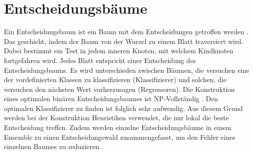 \chapter{Entscheidungsbäume}
\label{chapter:decision_trees}
Ein Entscheidungsbaum ist ein Baum mit dem Entscheidungen getroffen werden \cite{quinlan1990decision}. Das geschieht, indem der Baum von der Wurzel zu einem Blatt traversiert wird. Dabei bestimmt ein
Test in jedem inneren Knoten, mit welchem Kindknoten fortgefahren wird. Jedes Blatt entspricht einer Entscheidung des Entscheidungsbaums. Es wird unterschieden zwischen Bäumen, die versuchen eine der
vordefinierten Klassen zu klassifizieren (Klassifizierer) und solchen, die versuchen den nächsten Wert vorherzusagen (Regressoren).
\newline
\newline
Die Konstruktion eines optimalen binären Entscheidungsbaumes ist NP-Vollständig \cite{laurent1976constructing}. Den optimalen Klassifizierer zu finden ist folglich sehr aufwendig.
Aus diesem Grund werden bei der Konstruktion Heuristiken verwendet, die nur lokal die beste Entscheidung treffen. Zudem werden einzelne Entscheidungsbäume in einem Ensemble zu einen
Entscheidungswald zusammengefasst, um den Fehler eines einzelnen Baumes zu reduzieren \cite{ScikitLearnEnsemble}.






